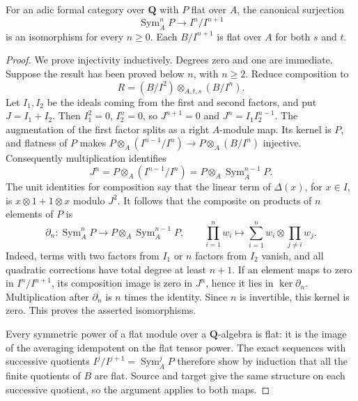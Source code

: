 \begin{lemma}\label{cat:L3}
For an adic formal category over $\mathbf Q$ with $P$ flat over $A$,
the canonical surjection
\[
 \operatorname{Sym}_A^nP\longrightarrow I^n/I^{n+1}
\]
is an isomorphism for every $n\geq0$.  Each $B/I^{n+1}$ is flat over
$A$ for both $s$ and $t$.
\end{lemma}
\begin{proof}
We prove injectivity inductively.  Degrees zero and one are immediate.
Suppose the result has been proved below $n$, with $n\geq2$.  Reduce
composition to
\[
 R=(B/I^2)\otimes_{A,t,s}(B/I^n).
\]
Let $I_1,I_2$ be the ideals coming from the first and second factors,
and put $J=I_1+I_2$.  Then $I_1^2=0$, $I_2^n=0$, so
$J^{n+1}=0$ and $J^n=I_1I_2^{n-1}$.
The augmentation of the first factor splits as a right $A$-module map.
Its kernel is $P$, and flatness of $P$ makes
$P\otimes_A(I^{n-1}/I^n)\to P\otimes_A(B/I^n)$ injective.
Consequently multiplication identifies
\[
 J^n=P\otimes_A(I^{n-1}/I^n)
     =P\otimes_A\operatorname{Sym}_A^{n-1}P.
\]
The unit identities for composition say that the linear term of
$\Delta(x)$, for $x\in I$, is $x\otimes1+1\otimes x$ modulo $J^2$.
It follows that the composite on products of $n$ elements of $P$ is
\[
 \partial_n:\operatorname{Sym}_A^nP\longrightarrow
       P\otimes_A\operatorname{Sym}_A^{n-1}P,
 \qquad
 \prod_{i=1}^n w_i\longmapsto
       \sum_{i=1}^n w_i\otimes\prod_{j\ne i}w_j.
\]
Indeed, terms with two factors from $I_1$ or $n$ factors from $I_2$
vanish, and all quadratic corrections have total degree at least $n+1$.
If an element maps to zero in $I^n/I^{n+1}$, its composition image is
zero in $J^n$, hence it lies in $\ker\partial_n$.
Multiplication after $\partial_n$ is $n$ times the identity.
Since $n$ is invertible, this kernel is zero.
This proves the asserted isomorphisms.

Every symmetric power of a flat module over a $\mathbf Q$-algebra is
flat: it is the image of the averaging idempotent on the flat tensor
power.  The exact sequences with successive quotients
$I^j/I^{j+1}=\operatorname{Sym}_A^jP$ therefore show by induction that
all the finite quotients of $B$ are flat.  Source and target give the
same structure on each successive quotient, so the argument applies
to both maps.
\end{proof}


